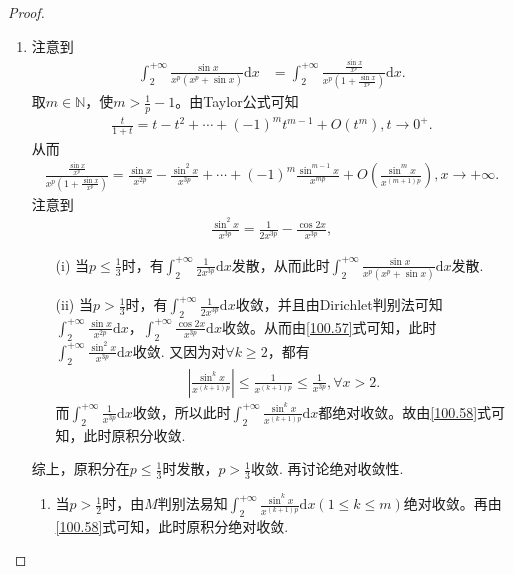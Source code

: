 \documentclass[../../main.tex]{subfiles}
\begin{document}
\begin{proof}
\begin{enumerate}
\item 注意到
\begin{align*}
\int_{2}^{+\infty}\frac{\sin x}{x^p(x^p + \sin x)}\mathrm{d}x&=\int_{2}^{+\infty}\frac{\frac{\sin x}{x^p}}{x^p(1 + \frac{\sin x}{x^p})}\mathrm{d}x.
\end{align*}
取\(m\in \mathbb{N}\)，使\(m > \frac{1}{p}-1\)。由Taylor公式可知
\begin{align*}
\frac{t}{1 + t}=t - t^2+\cdots + (-1)^mt^{m - 1}+O(t^m),t\rightarrow 0^+.
\end{align*}
从而
\begin{align}
\frac{\frac{\sin x}{x^p}}{x^p(1 + \frac{\sin x}{x^p})}=\frac{\sin x}{x^{2p}}-\frac{\sin^2 x}{x^{3p}}+\cdots + (-1)^m\frac{\sin^{m - 1} x}{x^{mp}}+O\left(\frac{\sin^m x}{x^{(m + 1)p}}\right),x\rightarrow +\infty. \label{100.58}
\end{align}
注意到
\begin{align}
\frac{\sin^2 x}{x^{3p}}=\frac{1}{2x^{3p}}-\frac{\cos 2x}{x^{3p}}, \label{100.57}
\end{align}
\begin{enumerate}
\item[(i)] 当\(p\leqslant \frac{1}{3}\)时，有\(\int_{2}^{+\infty}\frac{1}{2x^{3p}}\mathrm{d}x\)发散，从而此时\(\int_{2}^{+\infty}\frac{\sin x}{x^p(x^p + \sin x)}\mathrm{d}x\)发散.
\item[(ii)] 当\(p > \frac{1}{3}\)时，有\(\int_{2}^{+\infty}\frac{1}{2x^{3p}}\mathrm{d}x\)收敛，并且由Dirichlet判别法可知\(\int_{2}^{+\infty}\frac{\sin x}{x^{2p}}\mathrm{d}x\)，\(\int_{2}^{+\infty}\frac{\cos 2x}{x^{3p}}\mathrm{d}x\)收敛。从而由\eqref{100.57}式可知，此时\(\int_{2}^{+\infty}\frac{\sin^2 x}{x^{3p}}\mathrm{d}x\)收敛.
又因为对\(\forall k\geqslant 2\)，都有
\begin{align*}
\left|\frac{\sin^k x}{x^{(k + 1)p}}\right|\leqslant\frac{1}{x^{(k + 1)p}}\leqslant\frac{1}{x^{3p}},\forall x > 2.
\end{align*}
而\(\int_{2}^{+\infty}\frac{1}{x^{3p}}\mathrm{d}x\)收敛，所以此时\(\int_{2}^{+\infty}\frac{\sin^k x}{x^{(k + 1)p}}\mathrm{d}x\)都绝对收敛。故由\eqref{100.58}式可知，此时原积分收敛.
\end{enumerate}
综上，原积分在\(p\leqslant \frac{1}{3}\)时发散，\(p > \frac{1}{3}\)收敛.
再讨论绝对收敛性.
\begin{enumerate}
\item 当\(p > \frac{1}{2}\)时，由$M$判别法易知\(\int_{2}^{+\infty}\frac{\sin^k x}{x^{(k + 1)p}}\mathrm{d}x(1\leqslant  k\leqslant  m)\)绝对收敛。再由\eqref{100.58}式可知，此时原积分绝对收敛.

\end{enumerate}
\end{enumerate}
\end{proof}
\end{document}
